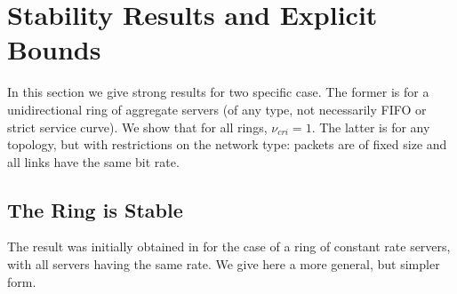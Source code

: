 \section{Stability Results and Explicit Bounds}

In this section we give strong results for two specific case. The
former is for a unidirectional ring of aggregate servers (of any
type, not necessarily FIFO or strict service curve). We show that
for all rings, $\nu_{cri}=1$. The latter is for any topology, but
with restrictions on the network type: packets are of fixed size
and all links have the same bit rate.

\subsection{The Ring is Stable}
   The result was
initially obtained in \cite{tg96} for the case of a ring of
constant rate servers, with all servers having the same rate. We
give here a more general, but simpler form.

